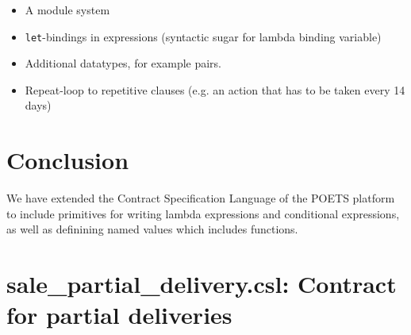 \documentclass[10pt,a4paper,final,oneside,openany,article]{memoir}
\begin{document}
\begin{itemize}
\item A module system
\item \lstinline{let}-bindings in expressions (syntactic sugar for
  lambda binding variable)
\item Additional datatypes, for example pairs.
\item Repeat-loop to repetitive clauses (e.g. an action that has to be
  taken every 14 days)
\end{itemize}

\chapter{Conclusion}
We have extended the Contract Specification Language of the POETS
platform to include primitives for writing lambda expressions and
conditional expressions, as well as definining named values which
includes functions. 

\printbibliography


\newpage
\appendix
\chapter{sale\_partial\_delivery.csl: Contract for partial deliveries}




\end{document}
